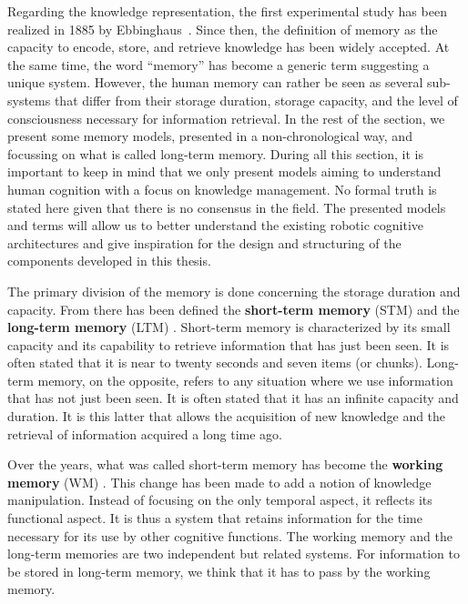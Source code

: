 Regarding the knowledge representation, the first experimental study has been realized in 1885 by Ebbinghaus~\cite{ebbinghaus_1885_gedachtnis}. Since then, the definition of memory as the capacity to encode, store, and retrieve knowledge \cite{roediger_1996_retrieval} has been widely accepted. At the same time, the word ``memory'' has become a generic term suggesting a unique system. However, the human memory can rather be seen as several sub-systems that differ from their storage duration, storage capacity, and the level of consciousness necessary for information retrieval. In the rest of the section, we present some memory models, presented in a non-chronological way, and focussing on what is called long-term memory. During all this section, it is important to keep in mind that we only present models aiming to understand human cognition with a focus on knowledge management. No formal truth is stated here given that there is no consensus in the field. The presented models and terms will allow us to better understand the existing robotic cognitive architectures and give inspiration for the design and structuring of the components developed in this thesis.

The primary division of the memory is done concerning the storage duration and capacity. From there has been defined the \textbf{short-term memory} (STM) and the \textbf{long-term memory} (LTM) \cite{atkinson_1966_some}. Short-term memory is characterized by its small capacity and its capability to retrieve information that has just been seen. It is often stated that it is near to twenty seconds and seven items (or chunks)\cite{miller_1956_human}. Long-term memory, on the opposite, refers to any situation where we use information that has not just been seen. It is often stated that it has an infinite capacity and duration. It is this latter that allows the acquisition of new knowledge and the retrieval of information acquired a long time ago.

Over the years, what was called short-term memory has become the \textbf{working memory} (WM) \cite{baddeley_1986_dementia}. This change has been made to add a notion of knowledge manipulation. Instead of focusing on the only temporal aspect, it reflects its functional aspect. It is thus a system that retains information for the time necessary for its use by other cognitive functions. The working memory and the long-term memories are two independent but related systems. For information to be stored in long-term memory, we think that it has to pass by the working memory.

